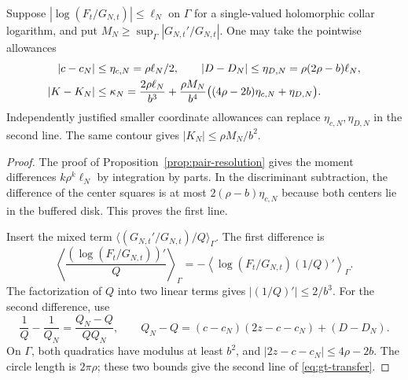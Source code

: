 \begin{proposition}
\label{prop:gt-transfer}
Suppose \(|\log(F_t/G_{N,t})|\le\ell_N\) on \(\Gamma\) for a
single-valued holomorphic collar logarithm, and put
\(M_N\ge\sup_\Gamma|G_{N,t}'/G_{N,t}|\). One may take the pointwise
allowances
\begin{align}
 |c-c_N|&\le\eta_{c,N}=\rho\ell_N/2,\qquad
 |D-D_N|\le\eta_{D,N}=\rho(2\rho-b)\ell_N,\notag\\
 |K-K_N|&\le\kappa_N=
 \frac{2\rho\ell_N}{b^3}
 +\frac{\rho M_N}{b^4}\big((4\rho-2b)\eta_{c,N}+\eta_{D,N}\big).
 \label{eq:gt-transfer}
\end{align}
Independently justified smaller coordinate allowances can replace
\(\eta_{c,N},\eta_{D,N}\) in the second line.
The same contour gives \(|K_N|\le\rho M_N/b^2\).
\end{proposition}

\begin{proof}
The proof of Proposition~\ref{prop:pair-resolution} gives the moment
differences \(k\rho^k\ell_N\) by integration by parts. In the
discriminant subtraction, the difference of the center squares is
at most \(2(\rho-b)\eta_{c,N}\) because both centers lie in the
buffered disk. This proves the first line.

Insert the mixed term
\(\langle (G_{N,t}'/G_{N,t})/Q\rangle_\Gamma\).
The first difference is
\[
 \left\langle \frac{(\log(F_t/G_{N,t}))'}{Q}\right\rangle_\Gamma
 =-\left\langle \log(F_t/G_{N,t})(1/Q)'\right\rangle_\Gamma .
\]
The factorization of \(Q\) into two linear terms gives
\(|(1/Q)'|\le2/b^3\). For the second difference, use
\[
 \frac1Q-\frac1{Q_N}=\frac{Q_N-Q}{QQ_N},\qquad
 Q_N-Q=(c-c_N)(2z-c-c_N)+(D-D_N).
\]
On \(\Gamma\), both quadratics have modulus at least \(b^2\), and
\(|2z-c-c_N|\le4\rho-2b\). The circle length is \(2\pi\rho\);
these two bounds give the second line of \eqref{eq:gt-transfer}.
\end{proof}

